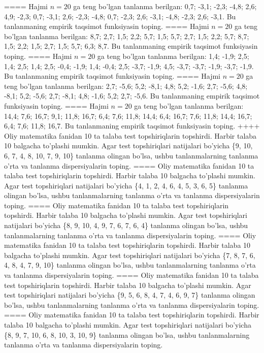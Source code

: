 ====
Hajmi \(n = 20\) ga teng bo'lgan tanlanma berilgan: 0,7; -3,1; -2,3; -4,8; 2,6; 4,9; -2,3; 0,7; -3,1; 2,6; -2,3; -4,8; 0,7; -2,3; 2,6; -3,1; -4,8; -2,3; 2,6; -3,1. Bu tanlanmaning empirik taqsimot funksiyasin toping.
====
Hajmi \(n = 20\) ga teng bo'lgan tanlanma berilgan: 8,7; 2,7; 1,5; 2,2; 5,7; 1,5; 5,7; 2,7; 1,5; 2,2; 5,7; 8,7; 1,5; 2,2; 1,5; 2,7; 1,5; 5,7; 6,3; 8,7. Bu tanlanmaning empirik taqsimot funksiyasin toping.
====
Hajmi \(n = 20\) ga teng bo'lgan tanlanma berilgan: 1,4; -1,9; 2,5; 1,4; 2,5; 1,4; 2,5; -0,4; -1,9; 1,4; -0,4; 2,5; -3,7; -1,9; 4,5; -3,7; -3,7; -1,9; -3,7; -1,9. Bu tanlanmaning empirik taqsimot funksiyasin toping.
====
Hajmi \(n = 20\) ga teng bo'lgan tanlanma berilgan: 2,7; -5,6; 5,2; -8,1; 4,8; 5,2; -1,6; 2,7; -5,6; 4,8; -8,1; 5,2; -5,6; 2,7; -8,1; 4,8; -1,6; 5,2; 2,7; -5,6. Bu tanlanmaning empirik taqsimot funksiyasin toping.
====
Hajmi \(n = 20\) ga teng bo'lgan tanlanma berilgan: 14,4; 7,6; 16,7; 9,1; 11,8; 16,7; 6,4; 7,6; 11,8; 14,4; 6,4; 16,7; 7,6; 11,8; 14,4; 16,7; 6,4; 7,6; 11,8; 16,7. Bu tanlanmaning empirik taqsimot funksiyasin toping.
++++
Oliy matematika fanidan 10 ta talaba test topshiriqlarin topshirdi. Harbir talaba 10 balgacha to'plashi mumkin. Agar test topshiriqlari natijalari bo'yicha \{9, 10, 6, 7, 4, 8, 10, 7, 9, 10\} tanlanma olingan bo'lsa, ushbu tanlanmalarning tanlanma o'rta va tanlanma dispersiyalarin toping.
====
Oliy matematika fanidan 10 ta talaba test topshiriqlarin topshirdi. Harbir talaba 10 balgacha to'plashi mumkin. Agar test topshiriqlari natijalari bo'yicha \{4, 1, 2, 4, 6, 4, 5, 3, 6, 5\} tanlanma olingan bo'lsa, ushbu tanlanmalarning tanlanma o'rta va tanlanma dispersiyalarin toping.
====
Oliy matematika fanidan 10 ta talaba test topshiriqlarin topshirdi. Harbir talaba 10 balgacha to'plashi mumkin. Agar test topshiriqlari natijalari bo'yicha \{8, 9, 10, 4, 9, 7, 6, 7, 6, 4\} tanlanma olingan bo'lsa, ushbu tanlanmalarning tanlanma o'rta va tanlanma dispersiyalarin toping.
====
Oliy matematika fanidan 10 ta talaba test topshiriqlarin topshirdi. Harbir talaba 10 balgacha to'plashi mumkin. Agar test topshiriqlari natijalari bo'yicha \{7, 8, 7, 6, 4, 8, 4, 7, 9, 10\} tanlanma olingan bo'lsa, ushbu tanlanmalarning tanlanma o'rta va tanlanma dispersiyalarin toping.
====
Oliy matematika fanidan 10 ta talaba test topshiriqlarin topshirdi. Harbir talaba 10 balgacha to'plashi mumkin. Agar test topshiriqlari natijalari bo'yicha \{9, 5, 6, 8, 4, 7, 4, 6, 9, 7\} tanlanma olingan bo'lsa, ushbu tanlanmalarning tanlanma o'rta va tanlanma dispersiyalarin toping.
====
Oliy matematika fanidan 10 ta talaba test topshiriqlarin topshirdi. Harbir talaba 10 balgacha to'plashi mumkin. Agar test topshiriqlari natijalari bo'yicha \{8, 9, 7, 10, 6, 8, 10, 3, 10, 9\} tanlanma olingan bo'lsa, ushbu tanlanmalarning tanlanma o'rta va tanlanma dispersiyalarin toping.
